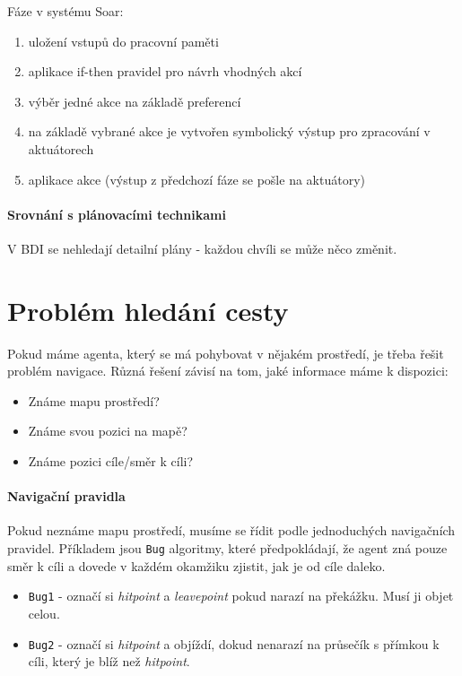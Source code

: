 \documentclass[a4paper]{article}      %
\begin{document}
Fáze v systému Soar:
\begin{enumerate}
\item uložení vstupů do pracovní paměti
\item aplikace if-then pravidel pro návrh vhodných akcí
\item výběr jedné akce na základě preferencí
\item na základě vybrané akce je vytvořen symbolický výstup pro zpracování v aktuátorech
\item aplikace akce (výstup z předchozí fáze se pošle na aktuátory)
\end{enumerate}

\paragraph{Srovnání s plánovacími technikami}
V BDI se nehledají detailní plány - každou chvíli se může něco změnit.


\section{Problém hledání cesty}
Pokud máme agenta, který se má pohybovat v nějakém prostředí, je třeba řešit problém
navigace. Různá řešení závisí na tom, jaké informace máme k dispozici:
\begin{itemize}
\item Známe mapu prostředí?
\item Známe svou pozici na mapě?
\item Známe pozici cíle/směr k cíli?
\end{itemize}

\paragraph{Navigační pravidla}
Pokud neznáme mapu prostředí, musíme se řídit podle jednoduchých navigačních pravidel.
Příkladem jsou \verb+Bug+ algoritmy, které předpokládají, že agent zná pouze směr k cíli a dovede v každém okamžiku zjistit,
jak je od cíle daleko.
\begin{itemize}
\item \verb+Bug1+ - označí si \emph{hitpoint} a \emph{leavepoint} pokud narazí na překážku. Musí ji objet celou.
\item \verb+Bug2+ - označí si \emph{hitpoint} a objíždí, dokud nenarazí na průsečík s přímkou k cíli, který je blíž než \emph{hitpoint}.
\end{itemize} 
\end{document}
